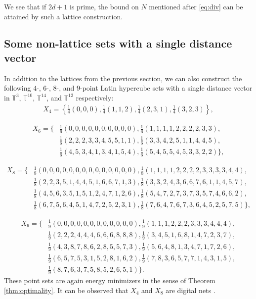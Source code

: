 \documentclass[a4paper,12pt]{article}
\numberwithin{equation}{section}
\theoremstyle{definition}
\newcommand{\bbT}{\mathbb{T}}
\begin{document}
We see that if $2d+1$ is prime, the bound on $N$ mentioned after \eqref{eq:div} can be attained by such a lattice construction.


\subsection{Some non-lattice  sets with a single distance vector}

In addition to the lattices from the previous section, we can also construct  the following $4$-, $6$-, $8$-, and $9$-point Latin hypercube sets with a single distance vector in $\bbT^3$, $\bbT^{10}$, $\bbT^{14}$, and $\bbT^{12}$ respectively:
\begin{align*}
    X_4 = \left\{\frac14 (0, 0, 0), \frac14 (1, 1, 2), \frac14 (2, 3, 1), \frac14 (3, 2, 3)\right\},
\end{align*}

\begin{align*}
    X_6 = \bigg\{ & \frac16 (0, 0, 0, 0, 0, 0, 0, 0, 0, 0), \frac16 (1, 1, 1, 1, 2, 2, 2, 2, 3, 3), \\
    & \frac16 (2, 2, 2, 3, 3, 4, 5, 5, 1, 1), \frac16 (3, 3, 4, 2, 5, 1, 1, 4, 4, 5), \\
    & \frac16 (4, 5, 3, 4, 1, 3, 4, 1, 5, 4), \frac16 (5, 4, 5, 5, 4, 5, 3, 3, 2, 2) \bigg\},
\end{align*}

\begin{align*}
    X_8 = \bigg\{ & \frac18 (0, 0, 0, 0, 0, 0, 0, 0, 0, 0, 0, 0, 0, 0), \frac18 (1, 1, 1, 1, 2, 2, 2, 2, 3, 3, 3, 3, 4, 4), \\
& \frac18 (2, 2, 3, 5, 1, 4, 4, 5, 1, 6, 6, 7, 1, 3), \frac18 (3, 3, 2, 4, 3, 6, 6, 7, 6, 1, 1, 4, 5, 7), \\
& \frac18 (4, 5, 6, 3, 5, 1, 5, 1, 2, 4, 7, 1, 2, 6), \frac18 (5, 4, 7, 2, 7, 3, 7, 3, 5, 7, 4, 6, 6, 2), \\
& \frac18 (6, 7, 5, 6, 4, 5, 1, 4, 7, 2, 5, 2, 3, 1), \frac18 (7, 6, 4, 7, 6, 7, 3, 6, 4, 5, 2, 5, 7, 5)\bigg\},
\end{align*}

\begin{align*}
    X_9 = \bigg\{ & \frac19 (0, 0, 0, 0, 0, 0, 0, 0, 0, 0, 0, 0), \frac19 (1, 1, 1, 2, 2, 2, 3, 3, 3, 4, 4, 4), \\
& \frac19 (2, 2, 2, 4, 4, 4, 6, 6, 6, 8, 8, 8), \frac19 (3, 4, 5, 1, 6, 8, 1, 4, 7, 2, 3, 7), \\
& \frac19 (4, 3, 8, 7, 8, 6, 2, 8, 5, 5, 7, 3), \frac19 (5, 6, 4, 8, 1, 3, 4, 7, 1, 7, 2, 6), \\
& \frac19 (6, 5, 7, 5, 3, 1, 5, 2, 8, 1, 6, 2), \frac19 (7, 8, 3, 6, 5, 7, 7, 1, 4, 3, 1, 5), \\
& \frac19 (8, 7, 6, 3, 7, 5, 8, 5, 2, 6, 5, 1)\bigg\}.
\end{align*}
These point sets are again energy minimizers in the sense of Theorem \ref{thm:optimality}. It can be observed that $X_4$ and $X_8$ are digital nets \cite{DP10}.
\end{document}

